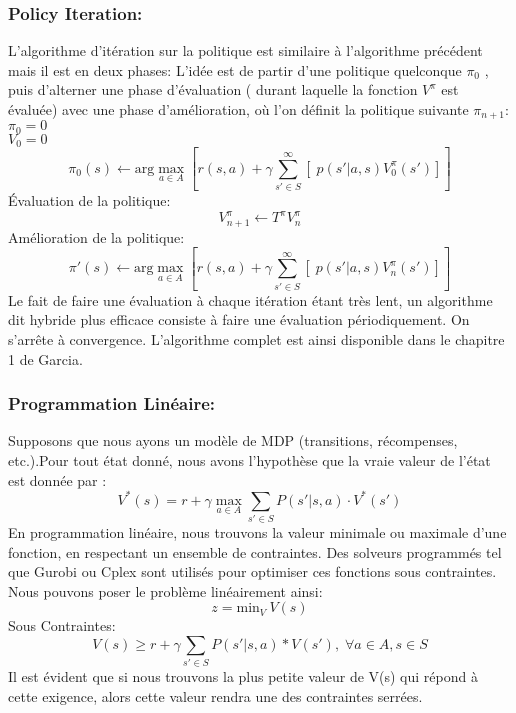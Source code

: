 \documentclass{article}
\begin{document}
    \subsubsection{Policy Iteration:}
L'algorithme d'itération sur la politique est similaire à l'algorithme précédent mais il est en deux phases: L'idée est de partir d'une politique quelconque $\pi_0$ , puis d'alterner une phase d'évaluation ( durant laquelle la fonction $V^{\pi}$ est évaluée) avec une phase d'amélioration, où l'on définit la politique suivante $\pi_{n+1}$:\\
$\pi_0 = 0$ \\
$ V_0 = 0 $ \\
$$ \pi_0(s) \leftarrow \text{arg}\max_{a \in A} [  r(s,a) + \gamma \sum_{s' \in S}^{\infty} [ \; p(s'|a,s)  V^\pi_{0}(s')  ] ]$$
Évaluation de la politique:
$$  V^\pi_{n+1} \leftarrow T^\pi V^\pi_{n} $$
Amélioration de la politique:
$$ \pi'(s) \leftarrow \text{arg}\max_{a \in A} [  r(s,a) + \gamma \sum_{s' \in S}^{\infty} [ \; p(s'|a,s)  V^\pi_{n}(s')  ] ]$$
Le fait de faire une évaluation à chaque itération étant très lent, un algorithme dit hybride plus efficace consiste à faire une évaluation périodiquement. On s'arrête à convergence.
L'algorithme complet est ainsi disponible dans le chapitre 1 de Garcia.

\subsubsection{Programmation Linéaire:}

Supposons que nous ayons un modèle de MDP (transitions, récompenses, etc.).Pour tout état donné, nous avons l'hypothèse que la vraie valeur de l'état est donnée par :
$$ V^*(s) = r + \gamma \max_{a \in A}\sum_{s' \in S} P(s' | s,a) \cdot V^*(s') $$
En programmation linéaire, nous trouvons la valeur minimale ou maximale d'une fonction, en respectant un ensemble de contraintes. Des solveurs programmés tel que Gurobi ou Cplex sont utilisés pour optimiser ces fonctions sous contraintes.\\
Nous pouvons poser le problème linéairement ainsi:
$$ z = \text{min}_V \ V(s) $$
Sous Contraintes:
$$ V(s) \geq r + \gamma\sum_{s' \in S} P(s' | s,a)*V(s'),\; \forall a\in A, s \in S $$
Il est évident que si nous trouvons la plus petite valeur de V(s) qui répond à cette exigence, alors cette valeur rendra une des contraintes serrées.
\end{document}
